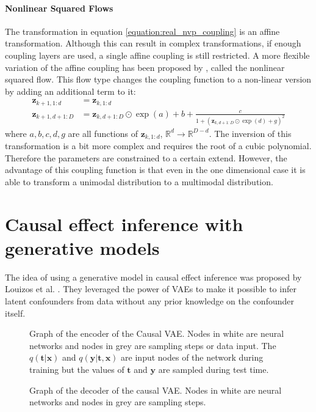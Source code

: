 \documentclass{report}
\newcommand{\R}{\mathbb{R}}
\newcommand{\bt}{\mathbf{t}}
\newcommand{\bx}{\mathbf{x}}
\newcommand{\by}{\mathbf{y}}
\newcommand{\bz}{\mathbf{z}}
\begin{document}
\subsubsection{Nonlinear Squared Flows}
The transformation in equation \ref{equation:real_nvp_coupling} is an affine transformation. Although this can result in complex transformations, if enough coupling layers are used, a single affine coupling is still restricted. A more flexible variation of the affine coupling has been proposed by \cite{ziegler2019latent}, called the nonlinear squared flow. This flow type changes the coupling function to a non-linear version by adding an additional term to it:
\begin{align}\label{equation:nonlinear_squared_flow}
    \bz_{k+1, 1:d} &= \bz_{k, 1:d} \\
    \bz_{k+1, d+1:D} &= \bz_{k, d+1:D} \odot \exp (a)  + b + \frac{c}{1 + (\bz_{k, d+1:D} \odot \exp (d) + g)^2}
\end{align}
where $a, b, c, d, g$ are all functions of $\bz_{k, 1:d}$, $\R^{d} \rightarrow \R^{D-d}$. The inversion of this transformation is a bit more complex and requires the root of a cubic polynomial. Therefore the parameters are constrained to a certain extend. However, the advantage of this coupling function is that even in the one dimensional case it is able to transform a unimodal distribution to a multimodal distribution.

\chapter{Causal effect inference with generative models}
The idea of using a generative model in causal effect inference was proposed by Louizos et al. \cite{louizos2017causal}. They leveraged the power of VAEs to make it possible to infer latent confounders from data without any prior knowledge on the confounder itself.

\begin{figure}
    \centering
    
    \caption{Graph of the encoder of the Causal VAE. Nodes in white are neural networks and nodes in grey are sampling steps or data input. The $q(\bt|\bx)$ and $q(\by|\bt, \bx)$ are input nodes of the network during training but the values of $\bt$ and $\by$ are sampled during test time.}
    \label{fig:cevae_encoder_graph}
\end{figure}
\begin{figure}
    \centering
    
    \caption{Graph of the decoder of the causal VAE. Nodes in white are neural networks and nodes in grey are sampling steps.} 
    \label{fig:cevae_decoder_graph}
\end{figure}
\end{document}
